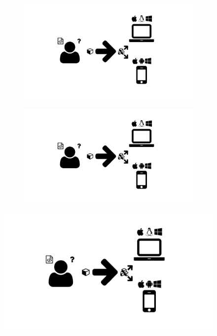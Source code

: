 \begin{figure}
  \centering
  \begin{subfigure}[b]{\textwidth}
    \includegraphics[width=\textwidth,page=13,trim=0.37cm 3.65cm 13.1cm 3.3cm, clip=true]{images/Figures.pdf}
    \caption{}
    \label{Figure:redox-detail-hover}
  \end{subfigure}
  \begin{subfigure}[b]{\textwidth}
    \includegraphics[width=\textwidth,page=13,trim=13.1cm 3.65cm 0.37cm 3.3cm, clip=true]{images/Figures.pdf}
    \caption{}
    \label{Figure:redox-detail-chebi}
  \end{subfigure}
  \caption{}
  \label{Figure:redox-detail}
\end{figure}

\begin{figure}
  \centering
  \includegraphics[width=\textwidth,page=14,trim=0.37cm .65cm 0.37cm 0.3cm, clip=true]{images/Figures.pdf}
  \caption{}
  \label{Figure:redox-detail}
\end{figure}

